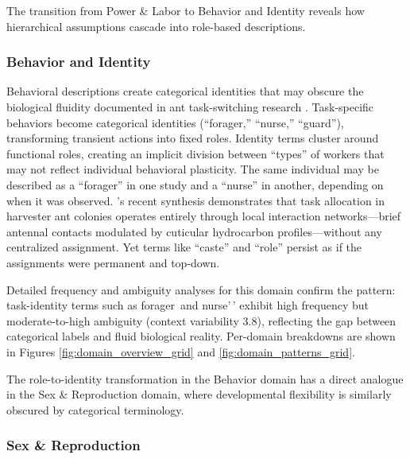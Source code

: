 \documentclass[
]{article}
\numberwithin{equation}{section}
\renewcommand{\texttt}[1]{%
    \colorbox{codebg}{\color{codefg}\ttfamily #1}%
}
\begin{document}
The transition from Power \& Labor to Behavior and Identity reveals how
hierarchical assumptions cascade into role-based descriptions.

\subsubsection{Behavior and Identity}\label{behavior-and-identity}

Behavioral descriptions create categorical identities that may obscure
the biological fluidity documented in ant task-switching research
\cite{ravary2007, gordon2010}. Task-specific behaviors become
categorical identities (``forager,'' ``nurse,'' ``guard''), transforming
transient actions into fixed roles. Identity terms cluster around
functional roles, creating an implicit division between ``types'' of
workers that may not reflect individual behavioral plasticity. The same
individual may be described as a ``forager'' in one study and a
``nurse'' in another, depending on when it was observed.
\citeauthor{gordon2023ecology}'s \citeyearpar{gordon2023ecology} recent
synthesis demonstrates that task allocation in harvester ant colonies
operates entirely through local interaction networks---brief antennal
contacts modulated by cuticular hydrocarbon profiles---without any
centralized assignment. Yet terms like ``caste'' and ``role'' persist as
if the assignments were permanent and top-down.

Detailed frequency and ambiguity analyses for this domain confirm the
pattern: task-identity terms such as
\texttt{forager\textquotesingle{}\textquotesingle{}\ and}nurse'\,'
exhibit high frequency but moderate-to-high ambiguity (context
variability 3.8), reflecting the gap between categorical labels and
fluid biological reality. Per-domain breakdowns are shown in Figures
\ref{fig:domain_overview_grid} and \ref{fig:domain_patterns_grid}.

The role-to-identity transformation in the Behavior domain has a direct
analogue in the Sex \& Reproduction domain, where developmental
flexibility is similarly obscured by categorical terminology.

\subsubsection{Sex \& Reproduction}\label{sex-reproduction}
\end{document}
